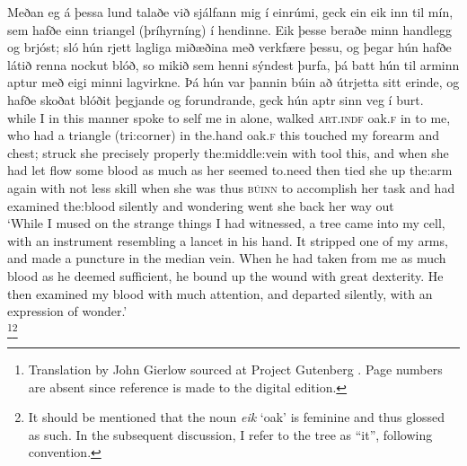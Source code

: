 \documentclass[output=paper,colorlinks,citecolor=brown]{langscibook}
\begin{document}
\ea\label{ex:klim1}
\gll Meðan eg á þessa lund talaðe við sjálfann mig í einrúmi, geck ein eik inn til mín, sem hafðe einn triangel (þríhyrníng) í hendinne. Eik þesse beraðe minn handlegg og brjóst; sló hún rjett lagliga miðæðina með verkfære þessu, og þegar hún hafðe látið renna nockut blóð, so mikið sem henni sýndest þurfa, þá batt hún til arminn aptur með eigi minni lagvirkne. Þá hún var þannin búin að útrjetta sitt erinde, og hafðe skoðat blóðit þegjande og forundrande, geck hún aptr sinn veg í burt.\\
while I in this manner spoke to self me in alone, walked \textsc{art}.\textsc{indf} oak.\textsc{f} in to me, who had a triangle (tri:corner) in the.hand oak.\textsc{f} this touched my forearm and chest; struck she precisely properly the:middle:vein with tool this, and when she had let flow some blood as much as her seemed to.need then tied she up the:arm again with not less skill when she was thus \textsc{búinn} to accomplish her task and had examined the:blood silently and wondering went she back her way out {}\\
\trans `While I mused on the strange things I had witnessed, a tree came into my cell, with an instrument resembling a lancet in his hand. It stripped one of my arms, and made a puncture in the median vein. When he had taken from me as much blood as he deemed sufficient, he bound up the wound with great dexterity. He then examined my blood with much attention, and departed silently, with an expression of wonder.'\\
\hfill \citep[29--30]{holberg1948nikulas}\footnote{Translation by John Gierlow sourced at Project Gutenberg \citep{holberg1845niels}. Page numbers are absent since reference is made to the digital edition.}\footnote{It should be mentioned that the noun \textit{eik} `oak' is feminine and thus glossed as such. In the subsequent discussion, I refer to the tree as  ``it'', following  convention.}
\z
\end{document}
